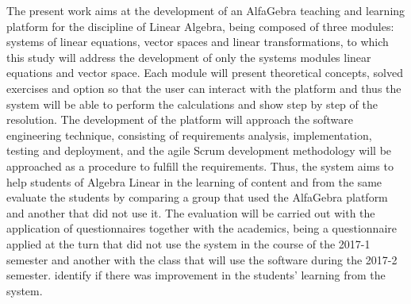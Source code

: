 \documentclass[tcc1]{uftex}
\begin{document}
\begin{foreignabstract}
    The present work aims at the development of an AlfaGebra teaching and learning platform for the discipline of Linear Algebra, being composed of three modules: systems of linear equations, vector spaces and linear transformations, to which this study will address the development of only the systems modules linear equations and vector space. Each module will present theoretical concepts, solved exercises and option so that the user can interact with the platform and thus the system will be able to perform the calculations and show step by step of the resolution. The development of the platform will approach the software engineering technique, consisting of requirements analysis, implementation, testing and deployment, and the agile Scrum development methodology will be approached as a procedure to fulfill the requirements. Thus, the system aims to help students of Algebra Linear in the learning of content and from the same evaluate the students by comparing a group that used the AlfaGebra platform and another that did not use it. The evaluation will be carried out with the application of questionnaires together with the academics, being a questionnaire applied at the turn that did not use the system in the course of the 2017-1 semester and another with the class that will use the software during the 2017-2 semester. identify if there was improvement in the students' learning from the system.
\end{foreignabstract}


\printlosymbols  
\printloabbreviations
\listoffigures            
\listoftables 
\tableofcontents 

\mainmatter
\renewcommand{\baselinestretch}{1.50}\normalsize










\backmatter 
\singlespacing   



\appendix


\onehalfspacing
\end{document}
